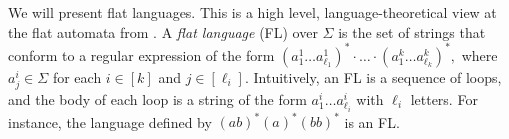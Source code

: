 We will present flat languages. This is a high level, language-theoretical view at the flat automata from \cite{Parosh:20:PLDI}. 
A \emph{flat language} (FL)  over $\Sigma$ is the set of strings 
that conform to a regular expression of the form
$
(a^1_1\ldots a^1_{\ell_1})^* \cdot \ldots \cdot (a^k_1\ldots a^k_{\ell_k})^*, 
$
where $a^i_j \in \Sigma$ for each $i \in [k]$ and $j \in [\ell_i]$.
Intuitively, an FL is a  sequence of loops,  and the body of each loop is a string of the form  $a^i_1\ldots a^i_{\ell_i}$ with $\ell_i$ letters. 
For instance, the language defined by $(ab)^*(a)^*(bb)^*$ is an FL.




